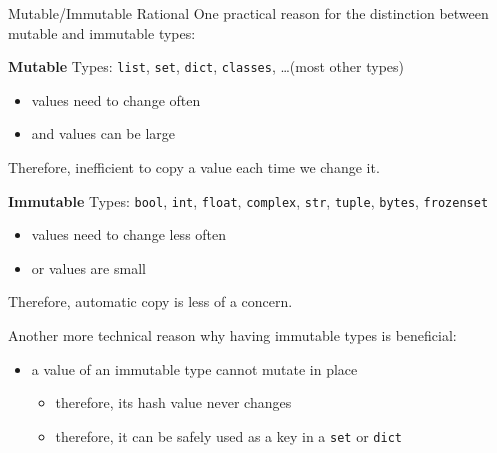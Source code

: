 \documentclass[10pt, colorlinks=true, urlcolor=blue]{beamer}
\begin{document}
\begin{frame}{Mutable/Immutable Rational}
  One practical reason for the distinction between mutable and immutable types:

  \vspace{1.6em}
  
  \textbf{Mutable} Types: \texttt{list}, \texttt{set}, \texttt{dict}, \texttt{classes}, \dots (most other types)
  \begin{itemize}
  \item values need to change often
  \item and values can be large
  \end{itemize}
  Therefore, inefficient to copy a value each time we change it.
  
  \vspace{1.6em}
  
  \textbf{Immutable} Types: \texttt{bool}, \texttt{int}, \texttt{float}, \texttt{complex}, \texttt{str}, \texttt{tuple}, \texttt{bytes}, \texttt{frozenset}
  \begin{itemize}
  \item values need to change less often
  \item or values are small
  \end{itemize}
  Therefore, automatic copy is less of a concern.

  \vspace{1.6em}
  
  Another more technical reason why having immutable types is beneficial:
  \begin{itemize}
  \item a value of an immutable type cannot mutate in place
    \begin{itemize}
    \item therefore, its hash value never changes
    \item therefore, it can be safely used as a key in a \texttt{set} or \texttt{dict}
    \end{itemize}
  \end{itemize}
\end{frame}
\end{document}
